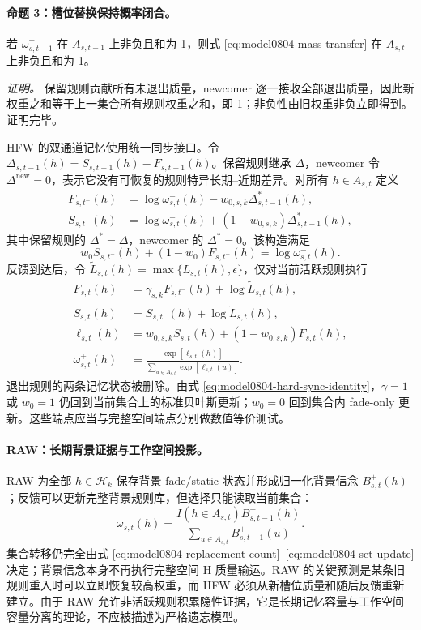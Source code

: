 \paragraph{命题 3：槽位替换保持概率闭合。}
若 $\omega^+_{s,t-1}$ 在 $A_{s,t-1}$ 上非负且和为 1，则式 \ref{eq:model0804-mass-transfer} 在 $A_{s,t}$ 上非负且和为 1。

\textit{证明。}
保留规则贡献所有未退出质量，newcomer 逐一接收全部退出质量，因此新权重之和等于上一集合所有规则权重之和，即 1；非负性由旧权重非负立即得到。证明完毕。

HFW 的双通道记忆使用统一同步接口。令 $\Delta_{s,t-1}(h)=S_{s,t-1}(h)-F_{s,t-1}(h)$。保留规则继承 $\Delta$，newcomer 令 $\Delta^{\mathrm{new}}=0$，表示它没有可恢复的规则特异长期--近期差异。对所有 $h\in A_{s,t}$ 定义
\begin{align}
    F_{s,t^-}(h)
    &=\log\omega^-_{s,t}(h)-w_{0,s,k}\Delta^*_{s,t-1}(h),\\
    S_{s,t^-}(h)
    &=\log\omega^-_{s,t}(h)+(1-w_{0,s,k})\Delta^*_{s,t-1}(h),
    \label{eq:model0804-hard-memory-sync}
\end{align}
其中保留规则的 $\Delta^*=\Delta$，newcomer 的 $\Delta^*=0$。该构造满足
\begin{equation}
    w_0S_{s,t^-}(h)+(1-w_0)F_{s,t^-}(h)
    =\log\omega^-_{s,t}(h).
    \label{eq:model0804-hard-sync-identity}
\end{equation}
反馈到达后，令 $\widetilde L_{s,t}(h)=\max\{L_{s,t}(h),\epsilon\}$，仅对当前活跃规则执行
\begin{align}
    F_{s,t}(h)
    &=\gamma_{s,k}F_{s,t^-}(h)
      +\log\widetilde L_{s,t}(h),\\
    S_{s,t}(h)
    &=S_{s,t^-}(h)+\log\widetilde L_{s,t}(h),\\
    \ell_{s,t}(h)
    &=w_{0,s,k}S_{s,t}(h)
      +(1-w_{0,s,k})F_{s,t}(h),\\
    \omega^+_{s,t}(h)
    &=\frac{\exp[\ell_{s,t}(h)]}
      {\sum_{u\in A_{s,t}}\exp[\ell_{s,t}(u)]}.
    \label{eq:model0804-hard-memory-update}
\end{align}
退出规则的两条记忆状态被删除。由式 \ref{eq:model0804-hard-sync-identity}，$\gamma=1$ 或 $w_0=1$ 仍回到当前集合上的标准贝叶斯更新；$w_0=0$ 回到集合内 fade-only 更新。这些端点应当与完整空间端点分别做数值等价测试。

\paragraph{RAW：长期背景证据与工作空间投影。}
RAW 为全部 $h\in\mathcal H_k$ 保存背景 fade/static 状态并形成归一化背景信念 $B^+_{s,t}(h)$；反馈可以更新完整背景规则库，但选择只能读取当前集合：
\begin{equation}
    \omega^-_{s,t}(h)
    =\frac{I(h\in A_{s,t})B^+_{s,t-1}(h)}
    {\sum_{u\in A_{s,t}}B^+_{s,t-1}(u)}.
    \label{eq:model0804-reservoir-projection}
\end{equation}
集合转移仍完全由式 \ref{eq:model0804-replacement-count}--\ref{eq:model0804-set-update} 决定；背景信念本身不再执行完整空间 H 质量输运。RAW 的关键预测是某条旧规则重入时可以立即恢复较高权重，而 HFW 必须从新槽位质量和随后反馈重新建立。由于 RAW 允许非活跃规则积累隐性证据，它是长期记忆容量与工作空间容量分离的理论，不应被描述为严格遗忘模型。

